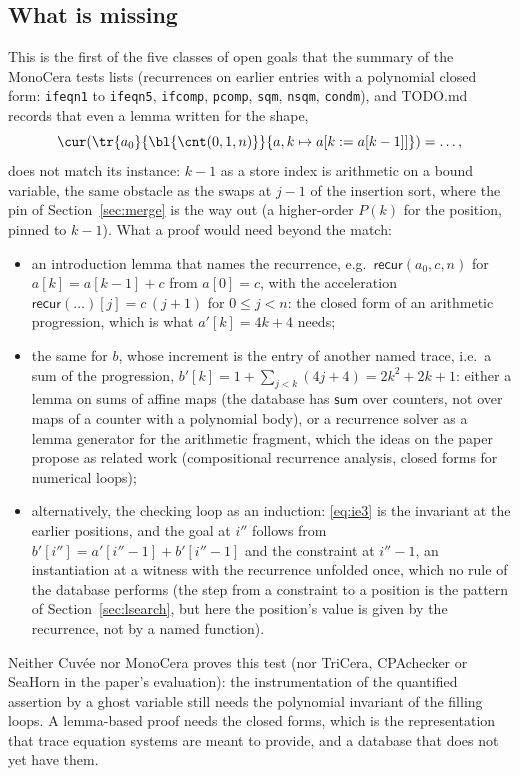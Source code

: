 \subsection{What is missing}
This is the first of the five classes of open goals that the summary of the MonoCera tests lists
(recurrences on earlier entries with a polynomial closed form: \texttt{ifeqn1} to \texttt{ifeqn5},
\texttt{ifcomp}, \texttt{pcomp}, \texttt{sqm}, \texttt{nsqm}, \texttt{condm}), and TODO.md records that
even a lemma written for the shape,
\[ \cur(\tr{a_0}{\bl{\cnt(0, 1, n)}}{a, k \mapsto a[k := a[k - 1]]}) = \ldots, \]
does not match its instance: $k - 1$ as a store index is arithmetic on a bound variable, the same obstacle
as the swaps at $j - 1$ of the insertion sort, where the pin of Section~\ref{sec:merge} is the way out
(a higher-order $P(k)$ for the position, pinned to $k - 1$). What a proof would need beyond the match:
\begin{itemize}[nosep]
\item an introduction lemma that names the recurrence, e.g.\ $\mathsf{recur}(a_0, c, n)$ for
  $a[k] = a[k - 1] + c$ from $a[0] = c$, with the acceleration $\mathsf{recur}(\ldots)[j] = c\,(j + 1)$ for
  $0 \le j < n$: the closed form of an arithmetic progression, which is what $a'[k] = 4k + 4$ needs;
\item the same for $b$, whose increment is the entry of another named trace, i.e.\ a sum of the
  progression, $b'[k] = 1 + \sum_{j < k} (4j + 4) = 2k^2 + 2k + 1$: either a lemma on sums of affine maps
  (the database has $\mathsf{sum}$ over counters, not over maps of a counter with a polynomial body), or a
  recurrence solver as a lemma generator for the arithmetic fragment, which the ideas on the paper
  propose as related work (compositional recurrence analysis, closed forms for numerical loops);
\item alternatively, the checking loop as an induction: \eqref{eq:ie3} is the invariant at the earlier
  positions, and the goal at $i''$ follows from $b'[i''] = a'[i'' - 1] + b'[i'' - 1]$ and the
  constraint at $i'' - 1$, an instantiation at a witness with the recurrence unfolded once, which no rule of
  the database performs (the step from a constraint to a position is the pattern of
  Section~\ref{sec:lsearch}, but here the position's value is given by the recurrence, not by a named
  function).
\end{itemize}
Neither Cuvée nor MonoCera proves this test (nor TriCera, CPAchecker or SeaHorn in the paper's evaluation):
the instrumentation of the quantified assertion by a ghost variable still needs the polynomial invariant of
the filling loops. A lemma-based proof needs the closed forms, which is the representation that trace
equation systems are meant to provide, and a database that does not yet have them.
